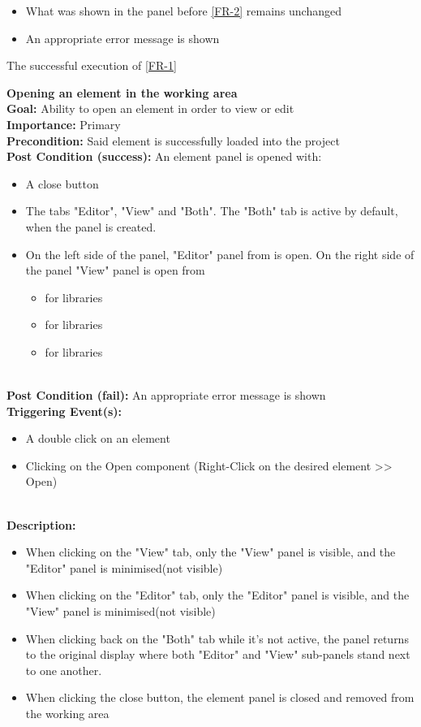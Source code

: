\documentclass[10pt,a4paper]{report}
\newcommand{\precondition}[1]{
    \textbf{Precondition: } #1 \leavevmode \\
}
\newcommand{\FRDescription}[8]{
    \textbf{#1} \leavevmode \\
    \textbf{Goal: } #2 \leavevmode \\
    \textbf{Importance: } #3 \leavevmode \\
    \precondition{#4}
    \textbf{Post Condition (success): } #5 \leavevmode \\
    \textbf{Post Condition (fail): } #6 \leavevmode \\
    \textbf{Triggering Event(s): } #7 \leavevmode \\
    \textbf{Description: } \leavevmode \\ 
    #8}
\begin{document}
\begin{FR}
{\begin{itemize}
        \item What was shown in the panel before \ref{FR-2} remains unchanged
        \item An appropriate error message is shown
    \end{itemize}}
    {The successful execution of \ref{FR-1}}
    \item \FRDescription{Opening an element in the working area}
    {Ability to open an element in order to view or edit}
    {Primary}
    {Said element is successfully loaded into the project}
    {An element panel is opened with:
    \begin{itemize}
        \item A close button 
        \item The tabs "Editor", "View" and "Both". The "Both" tab is active by default, when the panel is created.
        \item On the left side of the panel, "Editor" panel from \label{FR-PLACEHOLDER} is open. %
        On the right side of the panel "View" panel is open from
        \begin{itemize}
        \item \label{FR-grca} for libraries
        \item \label{FR-grca} for libraries
        \item \label{FR-grca} for libraries 
    \end{itemize}
    \end{itemize}}
    {An appropriate error message is shown}
    {\begin{itemize}
        \item A double click on an element
        \item Clicking on the Open component (Right-Click on the desired element >> Open)
    \end{itemize}}
    {\begin{itemize}
        \item When clicking on the "View" tab, only the "View" panel is visible, and the "Editor" panel is minimised(not visible)
        \item When clicking on the "Editor" tab, only the "Editor" panel is visible, and the "View" panel is minimised(not visible)
        \item When clicking back on the "Both" tab while it's not active, the panel returns to the original display where both "Editor" and "View" sub-panels stand next to one another.
        \item When clicking the close button, the element panel is closed and removed from the working area 

\end{itemize}}
\end{FR}
\end{document}
